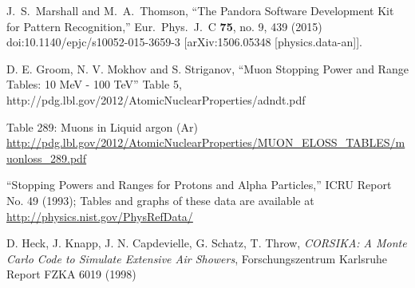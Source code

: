 \documentclass[a4paper,11pt]{article}
\begin{document}
\begin{thebibliography}{99}



  J.~S.~Marshall and M.~A.~Thomson,
  ``The Pandora Software Development Kit for Pattern Recognition,''
  Eur.\ Phys.\ J.\ C {\bf 75}, no. 9, 439 (2015)
  doi:10.1140/epjc/s10052-015-3659-3
  [arXiv:1506.05348 [physics.data-an]].

  D. E. Groom, N. V. Mokhov and S. Striganov, ``Muon Stopping Power and Range Tables: 10 MeV - 100 TeV'' Table 5,
  http://pdg.lbl.gov/2012/AtomicNuclearProperties/adndt.pdf

   Table 289: Muons in Liquid argon (Ar) \url{http://pdg.lbl.gov/2012/AtomicNuclearProperties/MUON_ELOSS_TABLES/muonloss_289.pdf}

   ``Stopping Powers and Ranges for Protons and Alpha Particles,'' ICRU Report No. 49 (1993); Tables and graphs of these data are available at \url{http://physics.nist.gov/PhysRefData/}

   D. Heck, J. Knapp, J. N. Capdevielle, G. Schatz, T. Throw, \emph{CORSIKA: A Monte Carlo Code to Simulate Extensive Air Showers}, Forschungszentrum Karlsruhe Report FZKA 6019 (1998)









\end{thebibliography}
\end{document}
